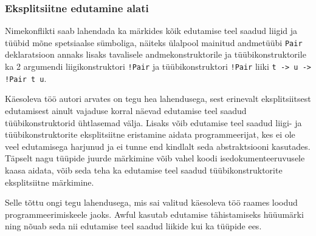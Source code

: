 \documentclass[12pt]{article}
\begin{document}
      \subsubsection{Eksplitsiitne edutamine alati}
        Nimekonflikti saab lahendada ka märkides kõik edutamise teel saadud liigid ja tüübid mõne spetsiaalse sümboliga, näiteks ülalpool mainitud andmetüübi \verb!Pair! deklaratsioon annaks lisaks tavalisele andmekonstruktorile ja tüübikonstruktorile ka 2 argumendi liigikonstruktori \verb"!Pair" ja tüübikonstruktori \verb"!Pair" liiki \verb"t -> u -> !Pair t u".

        Käesoleva töö autori arvates on tegu hea lahendusega, sest erinevalt eksplitsiitsest edutamisest ainult vajaduse korral näevad edutamise teel saadud tüübikonstruktorid ühtlasemad välja. Lisaks võib edutamise teel saadud liigi- ja tüübikonstruktorite eksplitsiitne eristamine aidata programmeerijat, kes ei ole veel edutamisega harjunud ja ei tunne end kindlalt seda abstraktsiooni kasutades. Täpselt nagu tüüpide juurde märkimine võib vahel koodi isedokumenteeruvusele kaasa aidata, võib seda teha ka edutamise teel saadud tüübikonstruktorite eksplitsiitne märkimine.

        Selle tõttu ongi tegu lahendusega, mis sai valitud käesoleva töö raames loodud programmeerimiskeele jaoks. Awful kasutab edutamise tähistamiseks hüüumärki ning nõuab seda nii edutamise teel saadud liikide kui ka tüüpide ees.
\end{document}
